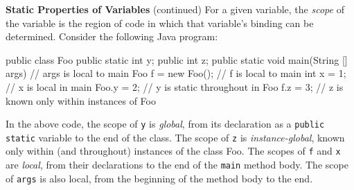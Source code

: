 \begin{minipage}[t]{\sw}
\slidenumber
\LARGE
{\bf Static Properties of Variables} (continued)\exx
For a given variable, the {\em scope} of the variable is
the region of code in which that variable's binding can be determined.
Consider the following Java program:
\Large
\begin{qv}
public class Foo {
   public static int y;
   public int z;
   public static void main(String [] args) {
     // args is local to main
     Foo f = new Foo(); // f is local to main
     int x = 1; // x is local in main
     Foo.y = 2; // y is static throughout in Foo
     f.z = 3; // z is known only within instances of Foo
   }
}
\end{qv}
\LARGE
In the above code,
the scope of \verb'y' is {\em global},
from its declaration
as a \verb'public static' variable to the end of the class.
The scope of \verb'z' is {\em instance-global},
known only within (and throughout) instances of the class Foo.
The scopes of \verb'f' and \verb'x' are {\em local},
from their declarations to the end of the \verb'main' method body.
The scope of \verb'args' is also local,
from the beginning of the method body to the end.

\end{minipage}
\clearpage
